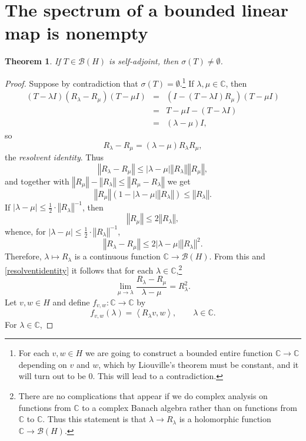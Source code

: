 \documentclass{article}
\newcommand{\inner}[2]{\left\langle #1, #2 \right\rangle}
\newcommand{\norm}[1]{\left\Vert #1 \right\Vert}
\newtheorem{theorem}{Theorem}
\begin{document}
\section{The spectrum of a bounded linear map is nonempty}
\begin{theorem}
If $T \in \mathscr{B}(H)$ is self-adjoint, then $\sigma(T) \neq \emptyset$.
\end{theorem}
\begin{proof}
Suppose by contradiction that $\sigma(T) = \emptyset$.\footnote{For each $v, w \in H$  we are going to construct a bounded entire
function $\mathbb{C} \to \mathbb{C}$ depending on $v$ and $w$, which by Liouville's theorem must be constant, and it will turn out to be 0. This will
lead to a contradiction.}
If $\lambda, \mu \in \mathbb{C}$, then
\begin{eqnarray*}
(T-\lambda I)(R_\lambda - R_\mu)(T-\mu I)&=&(I-(T-\lambda I) R_\mu)(T-\mu I)\\
&=&T-\mu I -(T-\lambda I)\\
&=&(\lambda - \mu)I,
\end{eqnarray*}
so
\begin{equation}
R_\lambda - R_\mu = (\lambda - \mu) R_\lambda R_\mu,
\label{resolventidentity}
\end{equation}
the {\em resolvent identity}.
Thus
\[
\norm{R_\lambda-R_\mu} \leq |\lambda - \mu| \norm{R_\lambda} \norm{R_\mu},
\]
and together with $\norm{R_\mu}-\norm{R_\lambda} \leq \norm{R_\mu- R_\lambda}$ we get
\[
\norm{R_\mu}(1-|\lambda-\mu| \norm{R_\lambda}) \leq \norm{R_\lambda}.
\]
If $|\lambda - \mu | \leq \frac{1}{2}\cdot\norm{R_\lambda}^{-1}$, then
\[
\norm{R_\mu} \leq 2\norm{R_\lambda},
\]
whence, for $|\lambda - \mu| \leq \frac{1}{2}\cdot\norm{R_\lambda}^{-1}$,
\[
\norm{R_\lambda - R_\mu} \leq 2 |\lambda-\mu| \norm{R_\lambda}^2.
\]
Therefore, $\lambda \mapsto R_\lambda$ is a continuous function $\mathbb{C} \to \mathscr{B}(H)$. 
From this and \eqref{resolventidentity} it follows that 
for each $\lambda \in \mathbb{C}$,\footnote{There are no complications
that appear if we do complex analysis on functions from $\mathbb{C}$ to a complex Banach algebra rather than on functions from $\mathbb{C}$ to $\mathbb{C}$. Thus this statement
is that $\lambda \to R_\lambda$ is a holomorphic function $\mathbb{C} \to \mathscr{B}(H)$.}
\[
\lim_{\mu \to \lambda} \frac{R_\lambda - R_\mu}{\lambda- \mu} = R_\lambda^2.
\]
Let $v, w \in H$ and define $f_{v,w}:\mathbb{C} \to \mathbb{C}$ by
\[
f_{v,w}(\lambda)=\inner{R_\lambda v}{w}, \qquad \lambda \in \mathbb{C}.
\]
For $\lambda \in \mathbb{C}$,

\end{proof}
\end{document}
